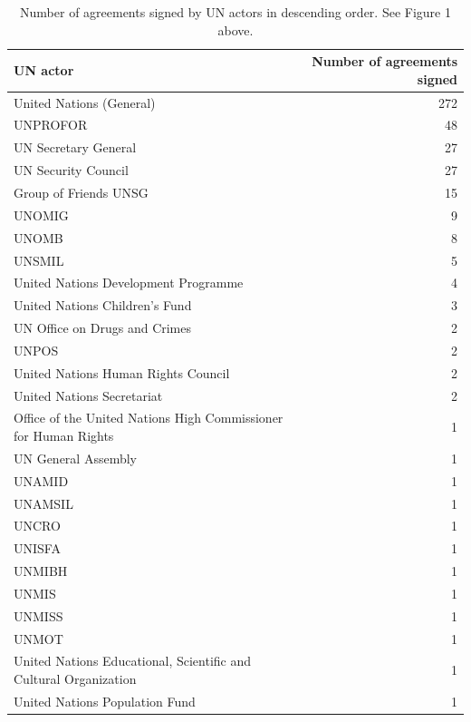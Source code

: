 \documentclass{article}
\begin{document}
\begin{table}[H]
\begin{center}
\small
\begin{tabularx}{\textwidth}{|X|r|}
    \hline
    \textbf{UN actor} & \textbf{Number of agreements signed} \\
    \hline
    \hline
United Nations (General) & 272 \\
\hline
UNPROFOR & 48 \\
\hline
UN Secretary General & 27 \\
\hline
UN Security Council & 27 \\
\hline
Group of Friends UNSG & 15 \\
\hline
UNOMIG & 9 \\
\hline
UNOMB & 8 \\
\hline
UNSMIL & 5 \\
\hline
United Nations Development Programme & 4 \\
\hline
United Nations Children's Fund & 3 \\
\hline
UN Office on Drugs and Crimes & 2 \\
\hline
UNPOS & 2 \\
\hline
United Nations Human Rights Council & 2 \\
\hline
United Nations Secretariat & 2 \\
\hline
Office of the United Nations High Commissioner for Human Rights & 1 \\
\hline
UN General Assembly & 1 \\
\hline
UNAMID & 1 \\
\hline
UNAMSIL & 1 \\
\hline
UNCRO & 1 \\
\hline
UNISFA & 1 \\
\hline
UNMIBH & 1 \\
\hline
UNMIS & 1 \\
\hline
UNMISS & 1 \\
\hline
UNMOT & 1 \\
\hline
United Nations Educational, Scientific and Cultural Organization & 1 \\
\hline
United Nations Population Fund & 1 \\
\hline
\end{tabularx}
\end{center}
\normalsize
\caption{Number of agreements signed by UN actors in descending order. See Figure 1 above.}
\end{table}
\end{document}
